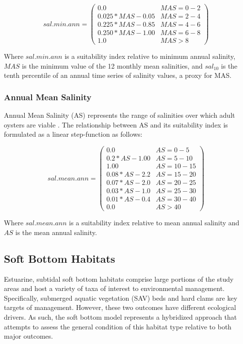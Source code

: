 \documentclass[
]{book}
\begin{document}
\[sal.min.ann = \begin{pmatrix} 0.0 & MAS=0-2\\
0.025*MAS-0.05 & MAS=2-4\\
0.225*MAS-0.85 & MAS=4-6\\
0.250*MAS-1.00 & MAS=6-8\\
1.0 & MAS>8
\end{pmatrix}\]

Where \(sal.min.ann\) is a suitability index relative to minimum annual salinity, \(MAS\) is the minimum value of the 12 monthly mean salinities, and \(sal_{10}\) is the tenth percentile of an annual time series of salinity values, a proxy for MAS.

\hypertarget{annual-mean-salinity}{%
\subsubsection{Annual Mean Salinity}\label{annual-mean-salinity}}

Annual Mean Salinity (AS) represents the range of salinities over which adult oysters are viable \citep{cake_habitat_1983}. The relationship between AS and its suitability index is formulated as a linear step-function as follows:

\[sal.mean.ann = \begin{pmatrix} 0.0 & AS=0-5\\
0.2*AS-1.00 & AS=5-10\\
1.00 & AS=10-15\\
0.08*AS-2.2 & AS=15-20\\
0.07*AS-2.0 & AS=20-25\\
0.03*AS-1.0 & AS=25-30\\
0.01*AS-0.4 & AS=30-40\\
0.0 & AS>40
\end{pmatrix}\]

Where \(sal.mean.ann\) is a suitability index relative to mean annual salinity and \(AS\) is the mean annual salinity.

\hypertarget{soft-bottom-habitats}{%
\subsection{Soft Bottom Habitats}\label{soft-bottom-habitats}}

Estuarine, subtidal soft bottom habitats comprise large portions of the study areas and host a variety of taxa of interest to environmental management. Specifically, submerged aquatic vegetation (SAV) beds and hard clams are key targets of management. However, these two outcomes have different ecological drivers. As such, the soft bottom model represents a hybridized approach that attempts to assess the general condition of this habitat type relative to both major outcomes.
\end{document}
